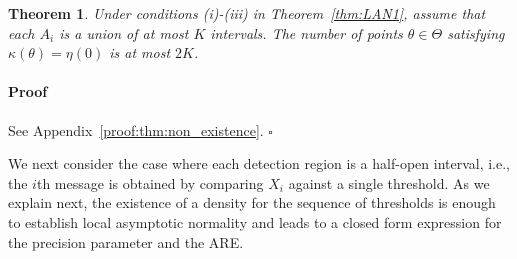 \documentclass[letterpaper, 11pt]{IEEEtran}      %
\newtheorem{thm}{\bf{Theorem}}
\newenvironment{proof}{\paragraph*{Proof}}{\hfill$\square$ \newline}
\begin{document}
\begin{thm} \label{thm:non_existence}
Under conditions (i)-(iii) in Theorem~\ref{thm:LAN1}, assume that each $A_i$ is a union of at most $K$ intervals. The number of points $\theta \in \Theta$ satisfying $\kappa(\theta) = \eta(0)$ is at most $2K$. 
\end{thm}

\begin{proof}
See Appendix~\ref{proof:thm:non_existence}.
\end{proof}

We next consider the case where each detection region is a half-open interval, i.e., the $i$th message is obtained by comparing $X_i$ against a single threshold. As we explain next, the existence of a density for the sequence of thresholds is enough to establish local asymptotic normality and leads to a closed form expression for the precision parameter and the ARE.  

\end{document}
